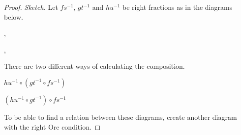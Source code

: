     \begin{proof}\emph{Sketch.}
        Let $fs^{-1}$, $gt^{-1}$ and $hu^{-1}$ be right fractions as in the diagrams below.
        \begin{center}
            ,
            , 
        \end{center}
        There are two different ways of calculating the composition.
        \begin{center}
            \begin{minipage}[c]{0.4\textwidth}
                \underline{$hu^{-1}\circ (gt^{-1}\circ fs^{-1})$}\\
            \end{minipage}
            \begin{minipage}[c]{0.4\textwidth}
                \underline{$(hu^{-1}\circ gt^{-1})\circ fs^{-1}$}\\
            \end{minipage}
        \end{center}
        To be able to find a relation between these diagrams, create another diagram with the right Ore condition.

\end{proof}
